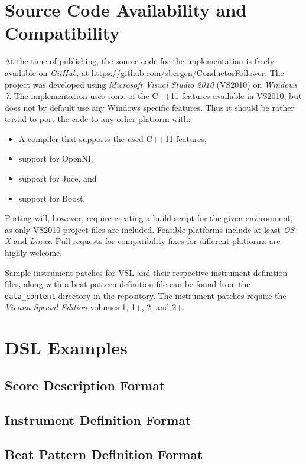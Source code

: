 \chapter{Source Code Availability and Compatibility}

At the time of publishing,
the source code for the implementation is freely
available on \textit{GitHub},
at \url{https://github.com/sbergen/ConductorFollower}.
The project was developed using
\textit{Microsoft Visual Studio 2010} (VS2010)
on \textit{Windows 7}.
The implementation uses some of the C++11 features
available in VS2010, but does not by default use any
Windows specific features.
Thus it should be rather trivial to port
the code to any other platform with:
\begin{itemize}
\item A compiler that supports the used C++11 features,
\item support for OpenNI,
\item support for Juce, and
\item support for Boost.
\end{itemize}
Porting will, however,
require creating a build script for the given environment,
as only VS2010 project files are included.
Feasible platforms include at least
\textit{OS X} and \textit{Linux}.
Pull requests for compatibility fixes for different platforms
are highly welcome.

Sample instrument patches for VSL and their
respective instrument definition files,
along with a beat pattern definition file
can be found from the \texttt{data\_content}
directory in the repository.
The instrument patches require
the \textit{Vienna Special Edition}
volumes 1, 1+, 2, and 2+.

\chapter{DSL Examples}
\label{appendix:dsl_samples}

\section{Score Description Format}



\section{Instrument Definition Format}



\section{Beat Pattern Definition Format}


